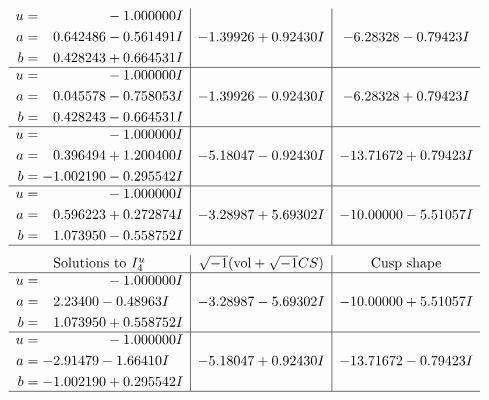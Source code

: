 \documentclass[1p]{elsarticle_modified}
\theoremstyle{definition}
\newcommand{\I}{\sqrt{-1}}
\begin{document}
$$\begin{array}{c|c|c}
\begin{aligned}
u &= \phantom{-0.000000 } -1.000000 I \\
a &= \phantom{-}0.642486 - 0.561491 I \\
b &= \phantom{-}0.428243 + 0.664531 I\end{aligned}
 & -1.39926 + 0.92430 I & -6.28328 - 0.79423 I \\ \hline\begin{aligned}
u &= \phantom{-0.000000 } -1.000000 I \\
a &= \phantom{-}0.045578 - 0.758053 I \\
b &= \phantom{-}0.428243 - 0.664531 I\end{aligned}
 & -1.39926 - 0.92430 I & -6.28328 + 0.79423 I \\ \hline\begin{aligned}
u &= \phantom{-0.000000 } -1.000000 I \\
a &= \phantom{-}0.396494 + 1.200400 I \\
b &= -1.002190 - 0.295542 I\end{aligned}
 & -5.18047 - 0.92430 I & -13.71672 + 0.79423 I \\ \hline\begin{aligned}
u &= \phantom{-0.000000 } -1.000000 I \\
a &= \phantom{-}0.596223 + 0.272874 I \\
b &= \phantom{-}1.073950 - 0.558752 I\end{aligned}
 & -3.28987 + 5.69302 I & -10.00000 - 5.51057 I\\
 \hline 
 \end{array}$$\newpage$$\begin{array}{c|c|c}  
\text{Solutions to }I^u_{4}& \I (\text{vol} + \sqrt{-1}CS) & \text{Cusp shape}\\
 \hline 
\begin{aligned}
u &= \phantom{-0.000000 } -1.000000 I \\
a &= \phantom{-}2.23400 - 0.48963 I \\
b &= \phantom{-}1.073950 + 0.558752 I\end{aligned}
 & -3.28987 - 5.69302 I & -10.00000 + 5.51057 I \\ \hline\begin{aligned}
u &= \phantom{-0.000000 } -1.000000 I \\
a &= -2.91479 - 1.66410 I \\
b &= -1.002190 + 0.295542 I\end{aligned}
 & -5.18047 + 0.92430 I & -13.71672 - 0.79423 I\\
 \hline 
 \end{array}$$\newpage\newpage\renewcommand{\arraystretch}{1}
\end{document}
